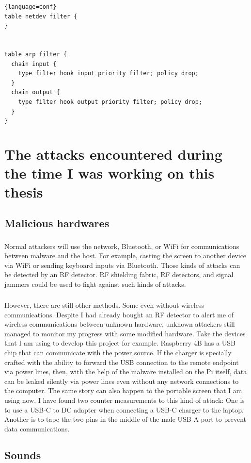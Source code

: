 \documentclass[mscthesis]{usiinfthesis}
\begin{document}
\begin{lstlisting}{language=conf}
table netdev filter {
}


table arp filter {
  chain input {
    type filter hook input priority filter; policy drop;
  }
  chain output {
    type filter hook output priority filter; policy drop;
  }
}
\end{lstlisting}

\chapter{The attacks encountered during the time I was working on this thesis}

\section{Malicious hardwares}
\paragraph{}
Normal attackers will use the network, Bluetooth, or WiFi for communications between malware and the host. For example, casting the screen to another device via WiFi or sending keyboard inputs via Bluetooth. Those kinds of attacks can be detected by an RF detector. RF shielding fabric, RF detectors, and signal jammers could be used to fight against such kinds of attacks.
\paragraph{}
However, there are still other methods. Some even without wireless communications. Despite I had already bought an RF detector to alert me of wireless communications between unknown hardware, unknown attackers still managed to monitor my progress with some modified hardware. Take the devices that I am using to develop this project for example. Raspberry 4B has a USB chip that can communicate with the power source. If the charger is specially crafted with the ability to forward the USB connection to the remote endpoint via power lines, then, with the help of the malware installed on the Pi itself, data can be leaked silently via power lines even without any network connections to the computer. The same story can also happen to the portable screen that I am using now. I have found two counter measurements to this kind of attack: One is to use a USB-C to DC adapter when connecting a USB-C charger to the laptop. Another is to tape the two pins in the middle of the male USB-A port to prevent data communications.

\section{Sounds}
\end{document}
